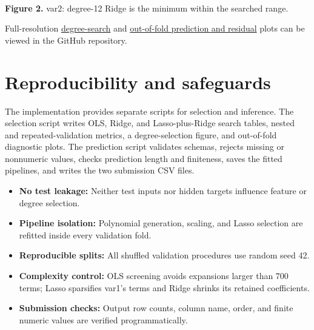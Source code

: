 \documentclass[10pt,a4paper]{article}
\begin{document}
\begin{center}
\\[2pt]
{\small\textbf{Figure 2.} var2: degree-12 Ridge is the minimum within the searched range.}
\end{center}

Full-resolution \href{https://github.com/oki-dokii/ML-Assignment1_BT2024128/blob/main/plots/degree_selection.png}{degree-search} and \href{https://github.com/oki-dokii/ML-Assignment1_BT2024128/blob/main/plots/oof_diagnostics.png}{out-of-fold prediction and residual} plots can be viewed in the GitHub repository.

\clearpage
\section{Reproducibility and safeguards}
\thispagestyle{fancy}
The implementation provides separate scripts for selection and inference. The selection script writes OLS, Ridge, and Lasso-plus-Ridge search tables, nested and repeated-validation metrics, a degree-selection figure, and out-of-fold diagnostic plots. The prediction script validates schemas, rejects missing or nonnumeric values, checks prediction length and finiteness, saves the fitted pipelines, and writes the two submission CSV files.

\begin{itemize}
\item \textbf{No test leakage:} Neither test inputs nor hidden targets influence feature or degree selection.
\item \textbf{Pipeline isolation:} Polynomial generation, scaling, and Lasso selection are refitted inside every validation fold.
\item \textbf{Reproducible splits:} All shuffled validation procedures use random seed 42.
\item \textbf{Complexity control:} OLS screening avoids expansions larger than 700 terms; Lasso sparsifies var1's terms and Ridge shrinks its retained coefficients.
\item \textbf{Submission checks:} Output row counts, column name, order, and finite numeric values are verified programmatically.
\end{itemize}
\end{document}
